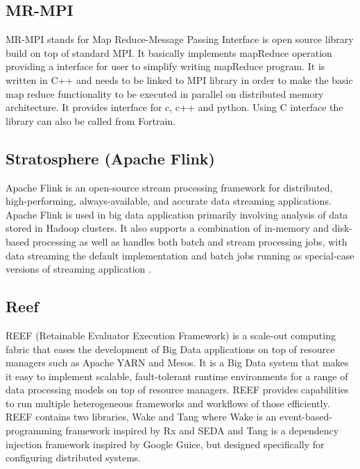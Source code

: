 \subsection{ MR-MPI}

     \cite{www-mapreducempi} MR-MPI stands for Map Reduce-Message
     Passing Interface is open source library build on top of standard
     MPI. It basically implements mapReduce operation providing a
     interface for user to simplify writing mapReduce program.  It is
     written in C++ and needs to be linked to MPI library in order to
     make the basic map reduce functionality to be executed in
     parallel on distributed memory architecture.  It provides
     interface for c, c++ and python. Using C interface the library
     can also be called from Fortrain.

\subsection{ Stratosphere (Apache Flink)}
     
     Apache Flink is an open-source stream processing framework for
     distributed, high-performing, always-available, and accurate data
     streaming applications. Apache Flink is used in big data application
     primarily involving analysis of data stored in Hadoop clusters. 
     It also supports a combination of in-memory and disk-based processing
     as well as handles both batch and stream processing jobs, with data
     streaming the default implementation and batch jobs running as 
     special-case versions of streaming application \cite{www-flink}.


\subsection{ Reef}

     REEF (Retainable Evaluator Execution Framework) \cite{www-reef}
     is a scale-out computing fabric that eases the development of Big
     Data applications on top of resource managers such as Apache YARN
     and Mesos. It is a Big Data system that makes it easy to
     implement scalable, fault-tolerant runtime environments for a
     range of data processing models on top of resource managers. REEF
     provides capabilities to run multiple heterogeneous frameworks
     and workflows of those efficiently. REEF contains two libraries,
     Wake and Tang where Wake is an event-based-programming framework
     inspired by Rx and SEDA and Tang is a dependency injection
     framework inspired by Google Guice, but designed specifically for
     configuring distributed systems.

